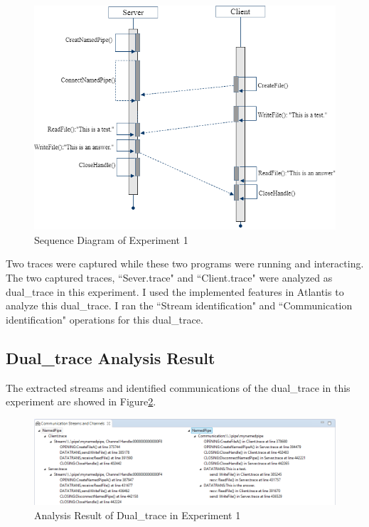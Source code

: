 \begin{figure}[H]
\centerline{\includegraphics[scale=0.7]{Figures/exp1}}
 \caption{Sequence Diagram of Experiment 1}
\label{exp1}
\end{figure}

Two traces were captured while these two programs were running and interacting. The two captured traces, ``Sever.trace" and ``Client.trace" were analyzed as dual\_trace in this experiment. I used the implemented features in Atlantis to analyze this dual\_trace. I ran the ``Stream identification" and ``Communication identification" operations for this dual\_trace. 

\subsection{Dual\_trace Analysis Result}
The extracted streams and identified communications of the dual\_trace in this experiment are showed in Figure\ref{result1}.

\begin{figure}[H]
\centerline{\includegraphics[scale=0.65]{Figures/result1}}
 \caption{Analysis Result of Dual\_trace in Experiment 1}
\label{result1}
\end{figure}

